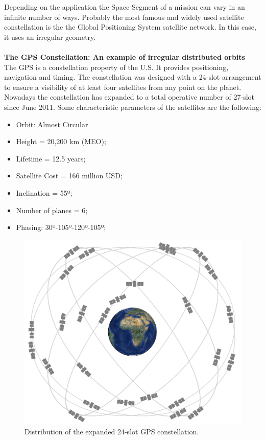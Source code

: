 Depending on the application the Space Segment of a mission can vary in an infinite number of ways. Probably the most famous and widely used satellite constellation is the the Global Positioning System satellite network. In this case, it uses an irregular geometry.
\\
\\
\textbf{The GPS Constellation: An example of irregular distributed orbits}
\\
The GPS is a constellation property of the U.S. It provides positioning, navigation and timing. The constellation was designed with a 24-slot arrangement to ensure a visibility of at least four satellites from any point on the planet. Nowadays the constellation has expanded to a total operative number of 27-slot since June 2011. Some characteristic parameters of the satellites are the following:

\begin{itemize}
\item Orbit: Almost Circular
\item Height = 20,200 km (MEO);
\item Lifetime = 12.5 years;
\item Satellite Cost = 166 million USD;
\item Inclination = 55º;
\item Number of planes = 6;
\item Phasing: 30º-105º-120º-105º;
\end{itemize}

\begin{figure}[H]
\begin{center}
\includegraphics[scale=0.16]{GPSconstellation.jpg}
\caption{Distribution of the expanded 24-slot GPS constellation.}
\end{center}
\end{figure}